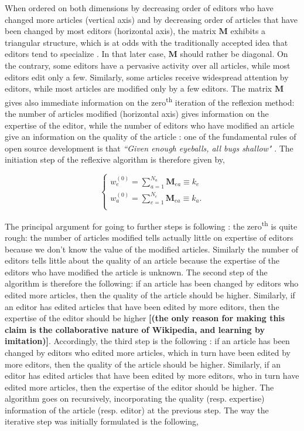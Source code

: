 When ordered on both dimensions by decreasing order of editors who have changed more articles (vertical axis) and by decreasing order of articles that have been changed by most editors (horizontal axis), the matrix $\mathbf{M}$ exhibits a triangular structure, which is at odds with the traditionally accepted idea that editors tend to specialize \cite{}. In that later case, $\mathbf{M}$ should rather be diagonal. On the contrary, some editors have a pervasive activity over all articles, while most editors edit only a few. Similarly, some articles receive widespread attention by editors, while most articles are modified only by a few editors. The matrix $\mathbf{M}$ gives also immediate information on the zero\textsuperscript{th} iteration of the reflexion method: the number of articles modified (horizontal axis) gives information on the expertise of the editor, while the number of editors who have modified an article give an information on the quality of the article : one of the fundamental rules of open source development is that {\it ``Given enough eyeballs, all bugs shallow"} \cite{raymond1999}. The initiation step of the reflexive algorithm is therefore given by,

\begin{equation}
\begin{cases}
 w_{e}^{(0)} = \sum_{a=1}^{N_{a}} \mathbf{M}_{ea} \equiv k_e\\
 w_{a}^{(0)} = \sum_{e=1}^{N_{e}} \mathbf{M}_{ea}  \equiv k_a.\\
\end{cases}
\end{equation}

The principal argument for going to further steps is following : the zero\textsuperscript{th} is quite rough: the number of articles modified tells actually little on expertise of editors because we don't know the value of the modified articles. Similarly the number of editors tells little about the quality of an article because the expertise of the editors who have modified the article is unknown. The second step of the algorithm is therefore the following: if an article has been changed by editors who edited more articles, then the quality of the article should be higher. Similarly, if an editor has edited articles that have been edited by more editors, then the expertise of the editor should be higher {\bf [(the only reason for making this claim is the collaborative nature of Wikipedia, and learning by imitation)]}.  Accordingly, the third step is the following : if an article has been changed by editors who edited more articles, which in turn have been edited by more editors, then the quality of the article should be higher. Similarly, if an editor has edited articles that have been edited by more editors, who in turn have edited more articles, then the expertise of the editor should be higher. The algorithm goes on recursively, incorporating the quality (resp. expertise) information of the article (resp. editor) at the previous step. The way the iterative step was initially formulated is the following, 

